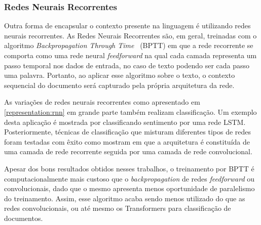 \subsubsection{Redes Neurais Recorrentes}

Outra forma de encapsular o contexto presente na linguagem é utilizando redes
neurais recorrentes.
As Redes Neurais Recorrentes são, em geral, treinadas com o algoritmo
\textit{Backpropagation Through Time}~\cite{williams95} (BPTT) em que a rede
recorrente se comporta como uma rede neural \textit{feedforward} na qual cada
camada representa um passo temporal nos dados de entrada, no caso de texto
podendo ser cada passo uma palavra.
Portanto, ao aplicar esse algoritmo sobre o texto, o contexto sequencial do
documento será capturado pela própria arquitetura da rede.

As variações de redes neurais recorrentes como apresentado em
\ref{representation:rnn} em grande parte também realizam classificação.
Um exemplo desta aplicação é mostrada por \citet{tai15} classificando sentimento
por uma rede LSTM.
Posteriormente, técnicas de classificação que misturam diferentes tipos de redes
foram testadas com êxito como mostram \citet{zhou16} em que a arquitetura é
constituída de uma camada de rede recorrente seguida por uma camada de rede
convolucional.

Apesar dos bons resultados obtidos nesses trabalhos, o treinamento por BPTT é
computacionalmente mais custoso que o \textit{backpropagation} de redes
\textit{feedforward} ou convolucionais, dado que o mesmo apresenta menos
oportunidade de paralelismo do treinamento.
Assim, esse algoritmo acaba sendo menos utilizado do que as redes
convolucionais, ou até mesmo os Transformers para classificação de documentos.

%
%
